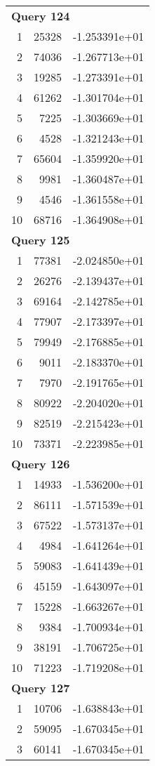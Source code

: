 \begin{longtable}[{p}]{@{}rrp{}@{}}
\midrule
\multicolumn{3}{l}{\bfseries Query 124} \\
1 & 25328 & -1.253391e+01 \\
2 & 74036 & -1.267713e+01 \\
3 & 19285 & -1.273391e+01 \\
4 & 61262 & -1.301704e+01 \\
5 & 7225 & -1.303669e+01 \\
6 & 4528 & -1.321243e+01 \\
7 & 65604 & -1.359920e+01 \\
8 & 9981 & -1.360487e+01 \\
9 & 4546 & -1.361558e+01 \\
10 & 68716 & -1.364908e+01 \\
\midrule
\multicolumn{3}{l}{\bfseries Query 125} \\
1 & 77381 & -2.024850e+01 \\
2 & 26276 & -2.139437e+01 \\
3 & 69164 & -2.142785e+01 \\
4 & 77907 & -2.173397e+01 \\
5 & 79949 & -2.176885e+01 \\
6 & 9011 & -2.183370e+01 \\
7 & 7970 & -2.191765e+01 \\
8 & 80922 & -2.204020e+01 \\
9 & 82519 & -2.215423e+01 \\
10 & 73371 & -2.223985e+01 \\
\midrule
\multicolumn{3}{l}{\bfseries Query 126} \\
1 & 14933 & -1.536200e+01 \\
2 & 86111 & -1.571539e+01 \\
3 & 67522 & -1.573137e+01 \\
4 & 4984 & -1.641264e+01 \\
5 & 59083 & -1.641439e+01 \\
6 & 45159 & -1.643097e+01 \\
7 & 15228 & -1.663267e+01 \\
8 & 9384 & -1.700934e+01 \\
9 & 38191 & -1.706725e+01 \\
10 & 71223 & -1.719208e+01 \\
\midrule
\multicolumn{3}{l}{\bfseries Query 127} \\
1 & 10706 & -1.638843e+01 \\
2 & 59095 & -1.670345e+01 \\
3 & 60141 & -1.670345e+01 \\

\end{longtable}
